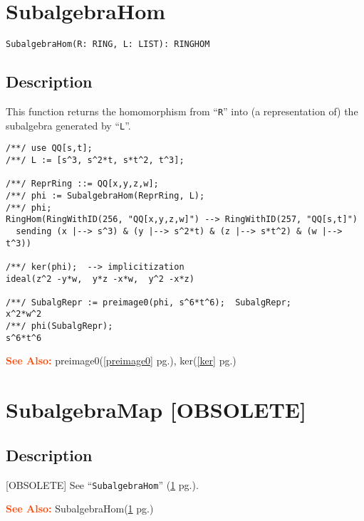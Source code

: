 \documentclass[a4paper]{mybook}
\newenvironment{command}{}{} %
\newcommand\SeeAlso{\par\textcolor{OrangeRed}{\textbf{\large See Also: }}}
\begin{document}
\section{SubalgebraHom}
\label{SubalgebraHom}
\begin{command} %


\begin{Verbatim}[label=syntax, rulecolor=\color{MidnightBlue},
frame=single]
SubalgebraHom(R: RING, L: LIST): RINGHOM
\end{Verbatim}


\subsection*{Description}

This function returns the homomorphism from ``\verb&R&'' into
(a representation of) the subalgebra generated by ``\verb&L&''.
\begin{Verbatim}[label=example, rulecolor=\color{PineGreen}, frame=single]
/**/ use QQ[s,t];
/**/ L := [s^3, s^2*t, s*t^2, t^3];

/**/ ReprRing ::= QQ[x,y,z,w];
/**/ phi := SubalgebraHom(ReprRing, L);
/**/ phi;
RingHom(RingWithID(256, "QQ[x,y,z,w]") --> RingWithID(257, "QQ[s,t]")
  sending (x |--> s^3) & (y |--> s^2*t) & (z |--> s*t^2) & (w |--> t^3))

/**/ ker(phi);  --> implicitization
ideal(z^2 -y*w,  y*z -x*w,  y^2 -x*z)

/**/ SubalgRepr := preimage0(phi, s^6*t^6);  SubalgRepr;
x^2*w^2
/**/ phi(SubalgRepr);
s^6*t^6
\end{Verbatim}


\SeeAlso %
  preimage0(\ref{preimage0} pg.\pageref{preimage0}), 
    ker(\ref{ker} pg.\pageref{ker})
\end{command} %

\section{SubalgebraMap [OBSOLETE]}
\label{SubalgebraMap [OBSOLETE]}
\begin{command} %



\subsection*{Description}

[OBSOLETE] See  ``\verb&SubalgebraHom&'' (\ref{SubalgebraHom} pg.\pageref{SubalgebraHom}).















\SeeAlso %
  SubalgebraHom(\ref{SubalgebraHom} pg.\pageref{SubalgebraHom})
\end{command} %
\end{document}
